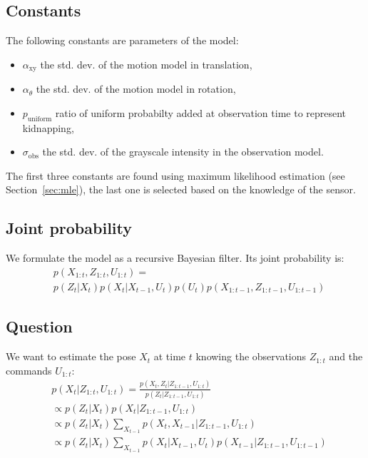 \documentclass[letterpaper, 10pt, conference]{ieeeconf}
\newcommand{\sect}[1]{Section~\ref{sec:#1}}
\begin{document}
\subsection{Constants}

The following constants are parameters of the model:
\begin{itemize}
\item $\alpha_\mathrm{xy}$ the std. dev. of the motion model in translation,
\item $\alpha_\theta$ the std. dev. of the motion model in rotation,
\item $p_\mathrm{uniform}$ ratio of uniform probabilty added at observation time to represent kidnapping,
\item $\sigma_\mathrm{obs}$ the std. dev. of the grayscale intensity in the observation model.
\end{itemize}
The first three constants are found using maximum likelihood estimation (see \sect{mle}), the last one is selected based on the knowledge of the sensor.


\subsection{Joint probability}

We formulate the model as a recursive Bayesian filter.
Its joint probability is:
\begin{equation}
\begin{split}
& p(X_{1:t}, Z_{1:t}, U_{1:t}) = \\
& p(Z_t|X_t) p(X_t|X_{t-1}, U_{t}) p(U_t) p(X_{1:t-1}, Z_{1:t-1}, U_{1:t-1})
\end{split}
\end{equation}

\subsection{Question}

We want to estimate the pose $X_t$ at time $t$ knowing the observations $Z_{1:t}$ and the commands $U_{1:t}$:
\begin{equation}
\begin{split}
& p(X_t|Z_{1:t},U_{1:t}) = \frac{p(X_t,Z_t | Z_{1:t-1}, U_{1:t})}{p(Z_t|Z_{1:t-1}, U_{1:t})} \\
 &\propto p(Z_t | X_t) p(X_t | Z_{1:t-1}, U_{1:t}) \\
 &\propto p(Z_t | X_t) \sum_{X_{t-1}} p(X_t, X_{t-1} | Z_{1:t-1}, U_{1:t} ) \\
 &\propto p(Z_t | X_t) \sum_{X_{t-1}} p(X_t|X_{t-1}, U_t) p(X_{t-1} | Z_{1:t-1}, U_{1:t-1})
\end{split}
\end{equation}
\end{document}
